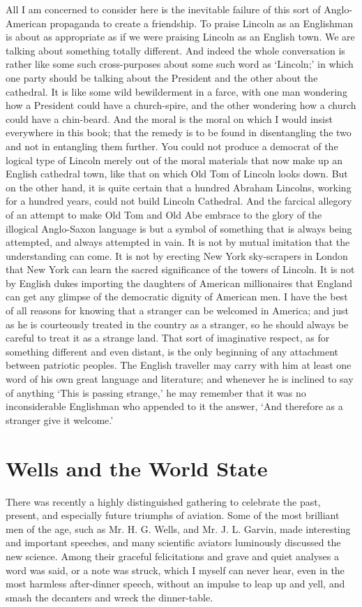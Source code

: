 \documentclass{book}
\begin{document}
All I am concerned to consider here is the inevitable failure of this sort of Anglo-American propaganda to create a friendship. To praise Lincoln as an Englishman is about as appropriate as if we were praising Lincoln as an English town. We are talking about something totally different. And indeed the whole conversation is rather like some such cross-purposes about some such word as ‘Lincoln;’ in which one party should be talking about the President and the other about the cathedral. It is like some wild bewilderment in a farce, with one man wondering how a President could have a church-spire, and the other wondering how a church could have a chin-beard. And the moral is the moral on which I would insist everywhere in this book; that the remedy is to be found in disentangling the two and not in entangling them further. You could not produce a democrat of the logical type of Lincoln merely out of the moral materials that now make up an English cathedral town, like that on which Old Tom of Lincoln looks down. But on the other hand, it is quite certain that a hundred Abraham Lincolns, working for a hundred years, could not build Lincoln Cathedral. And the farcical allegory of an attempt to make Old Tom and Old Abe embrace to the glory of the illogical Anglo-Saxon language is but a symbol of something that is always being attempted, and always attempted in vain. It is not by mutual imitation that the understanding can come. It is not by erecting New York sky-scrapers in London that New York can learn the sacred significance of the towers of Lincoln. It is not by English dukes importing the daughters of American millionaires that England can get any glimpse of the democratic dignity of American men. I have the best of all reasons for knowing that a stranger can be welcomed in America; and just as he is courteously treated in the country as a stranger, so he should always be careful to treat it as a strange land. That sort of imaginative respect, as for something different and even distant, is the only beginning of any attachment between patriotic peoples. The English traveller may carry with him at least one word of his own great language and literature; and whenever he is inclined to say of anything ‘This is passing strange,’ he may remember that it was no inconsiderable Englishman who appended to it the answer, ‘And therefore as a stranger give it welcome.’

\chapter{Wells and the World State}
\label{chapter-14}
There was recently a highly distinguished gathering to celebrate the past, present, and especially future triumphs of aviation. Some of the most brilliant men of the age, such as Mr. H. G. Wells, and Mr. J. L. Garvin, made interesting and important speeches, and many scientific aviators luminously discussed the new science. Among their graceful felicitations and grave and quiet analyses a word was said, or a note was struck, which I myself can never hear, even in the most harmless after-dinner speech, without an impulse to leap up and yell, and smash the decanters and wreck the dinner-table.
\end{document}
